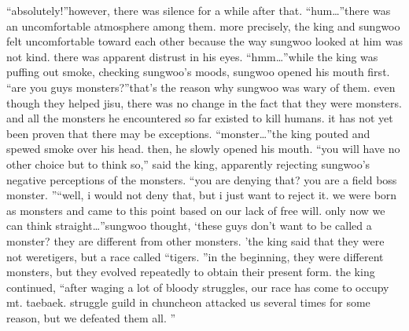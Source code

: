 “absolutely!”however, there was silence for a while after that.
“hum…”there was an uncomfortable atmosphere among them.
 more precisely, the king and sungwoo felt uncomfortable toward each other because the way sungwoo looked at him was not kind.
 there was apparent distrust in his eyes.
“hmm…”while the king was puffing out smoke, checking sungwoo’s moods, sungwoo opened his mouth first.
“are you guys monsters?”that’s the reason why sungwoo was wary of them.
 even though they helped jisu, there was no change in the fact that they were monsters.
 and all the monsters he encountered so far existed to kill humans.
 it has not yet been proven that there may be exceptions.
“monster…”the king pouted and spewed smoke over his head.
then, he slowly opened his mouth.
“you will have no other choice but to think so,” said the king, apparently rejecting sungwoo’s negative perceptions of the monsters.
“you are denying that? you are a field boss monster.
”“well, i would not deny that, but i just want to reject it.
 we were born as monsters and came to this point based on our lack of free will.
 only now we can think straight…”sungwoo thought, ‘these guys don’t want to be called a monster? they are different from other monsters.
’the king said that they were not weretigers, but a race called “tigers.
”in the beginning, they were different monsters, but they evolved repeatedly to obtain their present form.
the king continued, “after waging a lot of bloody struggles, our race has come to occupy mt.
 taebaek.
 struggle guild in chuncheon attacked us several times for some reason, but we defeated them all.
”

 